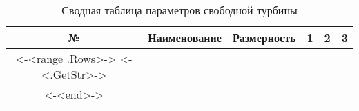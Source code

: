 \begin{center}
    \begin{longtable}{|c|c|c|c|c|c|}
        \caption{Сводная таблица параметров свободной турбины} \label{tab:ft-stage-total}
        \hline
        \textbf{№} &
        \textbf{Наименование} &
        \textbf{Размерность} &
        \textbf{1} &
        \textbf{2} &
        \textbf{3} \\\hline
        \endhead
        <-<range .Rows>->
        <-<.GetStr>-> \\\hline
        <-<end>->
    \end{longtable}
\end{center}
